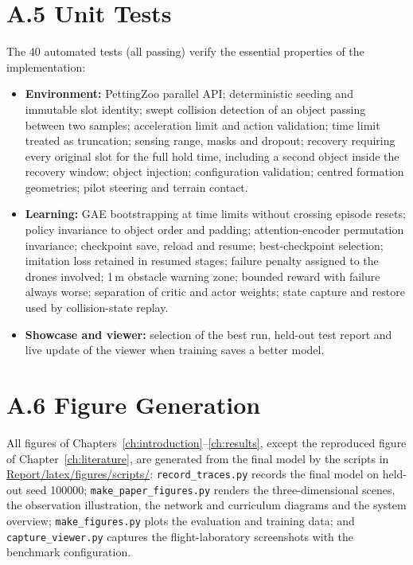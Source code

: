 \section*{A.5 Unit Tests}
The 40 automated tests (all passing) verify the essential properties of the implementation:
\begin{itemize}
  \item \textbf{Environment:} PettingZoo parallel API; deterministic seeding and immutable slot identity; swept
        collision detection of an object passing between two samples; acceleration limit and action validation;
        time limit treated as truncation; sensing range, masks and dropout; recovery requiring every original
        slot for the full hold time, including a second object inside the recovery window; object injection;
        configuration validation; centred formation geometries; pilot steering and terrain contact.
  \item \textbf{Learning:} GAE bootstrapping at time limits without crossing episode resets; policy invariance
        to object order and padding; attention-encoder permutation invariance; checkpoint save, reload and resume;
        best-checkpoint selection; imitation loss retained in resumed stages; failure penalty assigned to the
        drones involved; 1\,m obstacle warning zone; bounded reward with failure always worse; separation of
        critic and actor weights; state capture and restore used by collision-state replay.
  \item \textbf{Showcase and viewer:} selection of the best run, held-out test report and live update of the
        viewer when training saves a better model.
\end{itemize}

\section*{A.6 Figure Generation}
All figures of Chapters~\ref{ch:introduction}--\ref{ch:results}, except the reproduced figure of
Chapter~\ref{ch:literature}, are generated from the final model by the scripts in
\url{Report/latex/figures/scripts/}: \texttt{record\_traces.py} records the final model on held-out seed
100000; \texttt{make\_paper\_figures.py} renders the three-dimensional scenes, the observation illustration, the
network and curriculum diagrams and the system overview; \texttt{make\_figures.py} plots the evaluation and
training data; and \texttt{capture\_viewer.py} captures the flight-laboratory screenshots with the benchmark
configuration.
